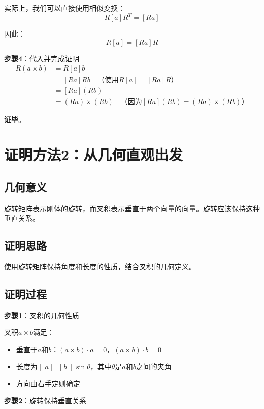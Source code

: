 \documentclass[12pt,a4paper]{article}
\begin{document}
实际上，我们可以直接使用相似变换：
\begin{equation}
R [a] R^T = [Ra]
\end{equation}

因此：
\begin{equation}
R [a] = [Ra] R
\end{equation}

\textbf{步骤4}：代入并完成证明
\begin{align}
R(a \times b) &= R [a] b \\
&= [Ra] R b \quad \text{（使用$R [a] = [Ra] R$）} \\
&= [Ra] (Rb) \\
&= (Ra) \times (Rb) \quad \text{（因为$[Ra] (Rb) = (Ra) \times (Rb)$）}
\end{align}

\textbf{证毕}。

\section{证明方法2：从几何直观出发}

\subsection{几何意义}

旋转矩阵表示刚体的旋转，而叉积表示垂直于两个向量的向量。旋转应该保持这种垂直关系。

\subsection{证明思路}

使用旋转矩阵保持角度和长度的性质，结合叉积的几何定义。

\subsection{证明过程}

\textbf{步骤1}：叉积的几何性质

叉积$a \times b$满足：
\begin{itemize}
\item 垂直于$a$和$b$：$(a \times b) \cdot a = 0$，$(a \times b) \cdot b = 0$
\item 长度为$\|a\| \|b\| \sin\theta$，其中$\theta$是$a$和$b$之间的夹角
\item 方向由右手定则确定
\end{itemize}

\textbf{步骤2}：旋转保持垂直关系
\end{document}
